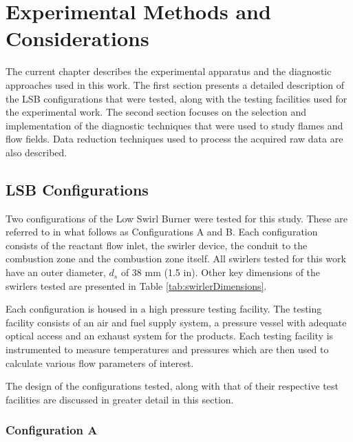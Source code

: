 \chapter{Experimental Methods and Considerations}
\label{ch:experimental}

The current chapter describes the experimental apparatus and the diagnostic approaches used in this work.
The first section presents a detailed description of the LSB configurations that were tested, along with the testing facilities used for the experimental work.
The second section focuses on the selection and implementation of the diagnostic techniques that were used to study flames and flow fields.
Data reduction techniques used to process the acquired raw data are also described.

\section{LSB Configurations}
\label{sec:experimental-lsb-configurations}

Two configurations of the Low Swirl Burner were tested for this study.
These are referred to in what follows as Configurations A and B.
Each configuration consists of the reactant flow inlet, the swirler device, the conduit to the combustion zone and the combustion zone itself.
All swirlers tested for this work have an outer diameter, \(d_s\) of 38 mm (1.5 in).
Other key dimensions of the swirlers tested are presented in Table \ref{tab:swirlerDimensions}.

Each configuration is housed in a high pressure testing facility.
The testing facility consists of an air and fuel supply system, a pressure vessel with adequate optical access and an exhaust system for the products.
Each testing facility is instrumented to measure temperatures and pressures which are then used to calculate various flow parameters of interest.

The design of the configurations tested, along with that of their respective test facilities are discussed in greater detail in this section.



\subsection{Configuration A}
\label{subsec:lsb-configuration-a}

